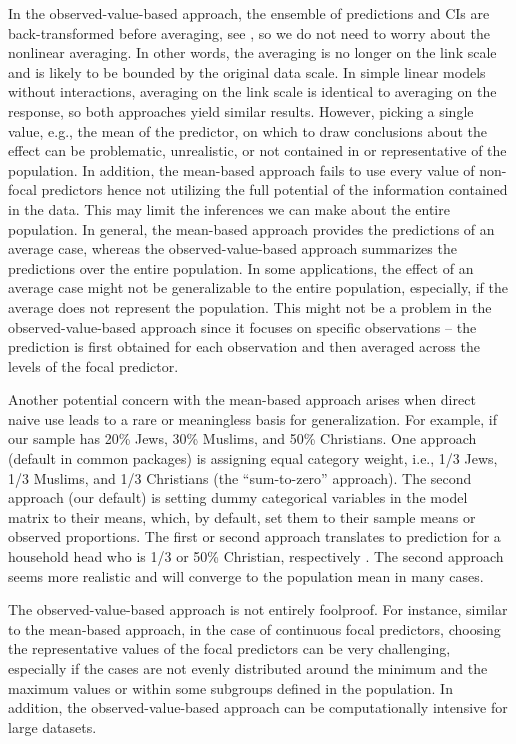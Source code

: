 In the observed-value-based approach, the ensemble of predictions and CIs are back-transformed before averaging, see , so we do not need to worry about the nonlinear averaging. In other words, the averaging is no longer on the link scale and is likely to be bounded by the original data scale. In simple linear models without interactions, averaging on the link scale is identical to averaging on the response, so both approaches yield similar results. However, picking a single value, e.g., the mean of the predictor, on which to draw conclusions about the effect can be problematic, unrealistic, or not contained in or representative of the population. In addition, the mean-based approach fails to use every value of non-focal predictors hence not utilizing the full potential of the information contained in the data. This may limit the inferences we can make about the entire population. In general, the mean-based approach provides the predictions of an average case, whereas the observed-value-based approach summarizes the predictions over the entire population. In some applications, the effect of an average case might not be generalizable to the entire population, especially, if the average does not represent the population. This might not be a problem in the observed-value-based approach since it focuses on specific observations -- the prediction is first obtained for each observation and then averaged across the levels of the focal predictor.

Another potential concern with the mean-based approach arises when direct naive use leads to a rare or meaningless basis for generalization. For example, if our sample has 20\% Jews, 30\% Muslims, and 50\% Christians. One approach (default in common packages) is assigning equal category weight, i.e., 1/3 Jews, 1/3 Muslims, and 1/3 Christians (the ``sum-to-zero'' approach). The second approach (our default) is setting dummy categorical variables in the model matrix to their means, which, by default, set them to their sample means or observed proportions. The first or second approach translates to prediction for a household head who is 1/3 or 50\% Christian, respectively \citep{hanmer2013behind}. The second approach seems more realistic and will converge to the population mean in many cases.

The observed-value-based approach is not entirely foolproof. For instance, similar to the mean-based approach, in the case of continuous focal predictors, choosing the representative values of the focal predictors can be very challenging, especially if the cases are not evenly distributed around the minimum and the maximum values or within some subgroups defined in the population. In addition, the observed-value-based approach can be computationally intensive for large datasets.




